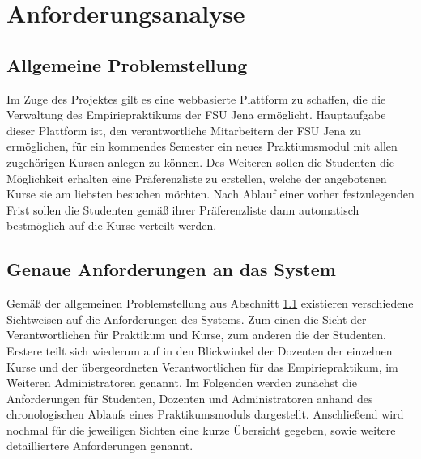 \chapter{Anforderungsanalyse}
\label{chapter:requirements}
    \section{Allgemeine Problemstellung}
    \label{Problemstellung}
        Im Zuge des Projektes gilt es eine webbasierte Plattform zu schaffen, die die Verwaltung des Empiriepraktikums der FSU Jena ermöglicht.
        Hauptaufgabe dieser Plattform ist, den verantwortliche Mitarbeitern der FSU Jena zu ermöglichen, für ein kommendes Semester ein neues Praktiumsmodul mit allen zugehörigen Kursen anlegen zu können.
        Des Weiteren sollen die Studenten die Möglichkeit erhalten eine Präferenzliste zu erstellen, welche der angebotenen Kurse sie am liebsten besuchen möchten.
        Nach Ablauf einer vorher festzulegenden Frist sollen die Studenten gemäß ihrer Präferenzliste dann automatisch bestmöglich auf die Kurse verteilt werden.     
    
    \section{Genaue Anforderungen an das System}
        Gemäß der allgemeinen Problemstellung aus Abschnitt \ref{Problemstellung} existieren verschiedene Sichtweisen auf die Anforderungen des Systems.
        Zum einen die Sicht der Verantwortlichen für Praktikum und Kurse, zum anderen die der Studenten.
        Erstere teilt sich wiederum auf in den Blickwinkel der Dozenten der einzelnen Kurse und der übergeordneten Verantwortlichen für das Empiriepraktikum, im Weiteren Administratoren genannt.
        Im Folgenden werden zunächst die Anforderungen für Studenten, Dozenten und Administratoren anhand des chronologischen Ablaufs eines Praktikumsmoduls dargestellt.
        Anschließend wird nochmal für die jeweiligen Sichten eine kurze Übersicht gegeben, sowie weitere detailliertere Anforderungen genannt.
        
